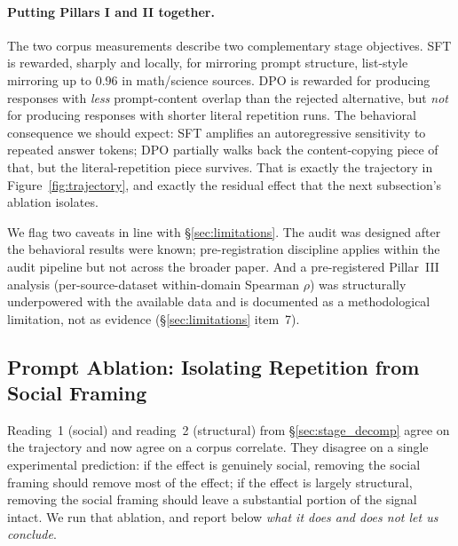 \documentclass{article}
\begin{document}
\paragraph{Putting Pillars I and II together.}
The two corpus measurements describe two complementary stage objectives. SFT is rewarded, sharply and locally, for mirroring prompt structure, list-style mirroring up to $0.96$ in math/science sources. DPO is rewarded for producing responses with \emph{less} prompt-content overlap than the rejected alternative, but \emph{not} for producing responses with shorter literal repetition runs. The behavioral consequence we should expect: SFT amplifies an autoregressive sensitivity to repeated answer tokens; DPO partially walks back the content-copying piece of that, but the literal-repetition piece survives. That is exactly the trajectory in Figure~\ref{fig:trajectory}, and exactly the residual effect that the next subsection's ablation isolates.

We flag two caveats in line with \S\ref{sec:limitations}. The audit was designed after the behavioral results were known; pre-registration discipline applies within the audit pipeline but not across the broader paper. And a pre-registered Pillar~III analysis (per-source-dataset within-domain Spearman $\rho$) was structurally underpowered with the available data and is documented as a methodological limitation, not as evidence (\S\ref{sec:limitations} item~7).

\subsection{Prompt Ablation: Isolating Repetition from Social Framing}
\label{sec:ablation}

\noindent Reading~1 (social) and reading~2 (structural) from \S\ref{sec:stage_decomp} agree on the trajectory and now agree on a corpus correlate. They disagree on a single experimental prediction: if the effect is genuinely social, removing the social framing should remove most of the effect; if the effect is largely structural, removing the social framing should leave a substantial portion of the signal intact. We run that ablation, and report below \emph{what it does and does not let us conclude}.
\end{document}
